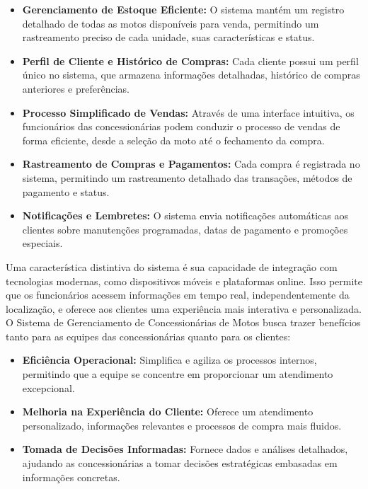         \begin{itemize}
        	\item \textbf{Gerenciamento de Estoque Eficiente:} O sistema mantém um registro detalhado de todas as motos disponíveis para venda, permitindo um rastreamento preciso de cada unidade, suas características e status.
        	
        	\item \textbf{Perfil de Cliente e Histórico de Compras:} Cada cliente possui um perfil único no sistema, que armazena informações detalhadas, histórico de compras anteriores e preferências.
        	
        	\item \textbf{Processo Simplificado de Vendas:} Através de uma interface intuitiva, os funcionários das concessionárias podem conduzir o processo de vendas de forma eficiente, desde a seleção da moto até o fechamento da compra.
        	
        	\item \textbf{Rastreamento de Compras e Pagamentos:} Cada compra é registrada no sistema, permitindo um rastreamento detalhado das transações, métodos de pagamento e status.
        	
        	\item \textbf{Notificações e Lembretes:} O sistema envia notificações automáticas aos clientes sobre manutenções programadas, datas de pagamento e promoções especiais.
        \end{itemize}
    
        
        	Uma característica distintiva do sistema é sua capacidade de integração com tecnologias modernas, como dispositivos móveis e plataformas online. Isso permite que os funcionários acessem informações em tempo real, independentemente da localização, e oferece aos clientes uma experiência mais interativa e personalizada. O Sistema de Gerenciamento de Concessionárias de Motos busca trazer benefícios tanto para as equipes das concessionárias quanto para os clientes:
        	
        \begin{itemize}
        	\item \textbf{Eficiência Operacional:} Simplifica e agiliza os processos internos, permitindo que a equipe se concentre em proporcionar um atendimento excepcional.
        	
        	\item \textbf{Melhoria na Experiência do Cliente:} Oferece um atendimento personalizado, informações relevantes e processos de compra mais fluidos.
        	
        	\item \textbf{Tomada de Decisões Informadas:} Fornece dados e análises detalhados, ajudando as concessionárias a tomar decisões estratégicas embasadas em informações concretas.
        \end{itemize}
        

